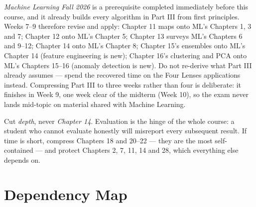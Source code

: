 \begin{conceptbox}
\emph{Machine Learning Fall 2026} is a prerequisite completed immediately before
this course, and it already builds every algorithm in Part III from first
principles. Weeks 7--9 therefore revise and apply: Chapter 11 maps onto ML's
Chapters 1, 3 and 7; Chapter 12 onto ML's Chapter 5; Chapter 13 surveys ML's
Chapters 6 and 9--12; Chapter 14 onto ML's Chapter 8; Chapter 15's ensembles
onto ML's Chapter 14 (feature engineering is new); Chapter 16's clustering and
PCA onto ML's Chapters 15--16 (anomaly detection is new). Do not re-derive what
Part III already assumes --- spend the recovered time on the Four Lenses
applications instead. Compressing Part III to three weeks rather than four is
deliberate: it finishes in Week 9, one week clear of the midterm (Week 10), so
the exam never lands mid-topic on material shared with Machine Learning.
\end{conceptbox}

\begin{alertbox}
Cut \emph{depth}, never \emph{Chapter 14}. Evaluation is the hinge of the whole
course: a student who cannot evaluate honestly will misreport every subsequent
result. If time is short, compress Chapters 18 and 20--22 --- they are the most
self-contained --- and protect Chapters 2, 7, 11, 14 and 28, which everything else
depends on.
\end{alertbox}

\section{Dependency Map}

